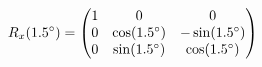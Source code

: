 \documentclass[preview]{standalone}
\begin{document}
\begin{align*}
\special{dvisvgm:raw <g id='unique000'>}R_x(1.5^\circ) = \begin{pmatrix} 1 & 0 & 0 \\ 0 & \cos(1.5^\circ) & -\sin(1.5^\circ) \\ 0 & \sin(1.5^\circ) & \cos(1.5^\circ) \end{pmatrix}\special{dvisvgm:raw </g>}
\end{align*}
\end{document}
